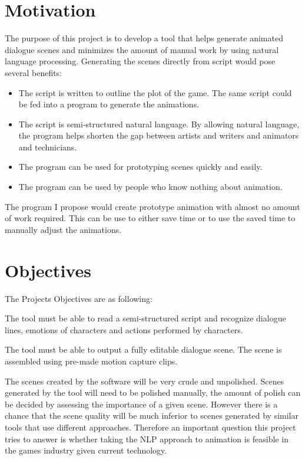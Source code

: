 \section{Motivation}

The purpose of this project is to develop a tool that helps generate animated dialogue scenes and minimizes the amount of manual work by using natural language processing. Generating the scenes directly from script would pose several benefits:

\begin{itemize}
\item The script is written to outline the plot of the game. The same script could be fed into a program to generate the animations.
\item The script is semi-structured natural language. By allowing natural language, the program helps shorten the gap between artists and writers and animators and technicians.
\item The program can be used for prototyping scenes quickly and easily.
\item The program can be used by people who know nothing about animation.
\end{itemize}

The program I propose would create prototype animation with almost no amount of work required. This can be use to either save time or to use the saved time to manually adjust the animations.

\section{Objectives}

The Projects Objectives are as following:


\noindent The tool must be able to read a semi-structured script and recognize dialogue lines, emotions of characters and actions performed by characters.


\noindent The tool must be able to output a fully editable dialogue scene. The scene is assembled using pre-made motion capture clips.

\bigskip
The scenes created by the software will be very crude and unpolished. Scenes generated by the tool will need to be polished manually, the amount of polish can be decided by assessing the importance of a given scene. However there is a chance that the scene quality will be much inferior to scenes generated by similar tools that use different approaches. Therefore an important question this project tries to answer is whether taking the NLP approach to animation is feasible in the games industry given current technology.



